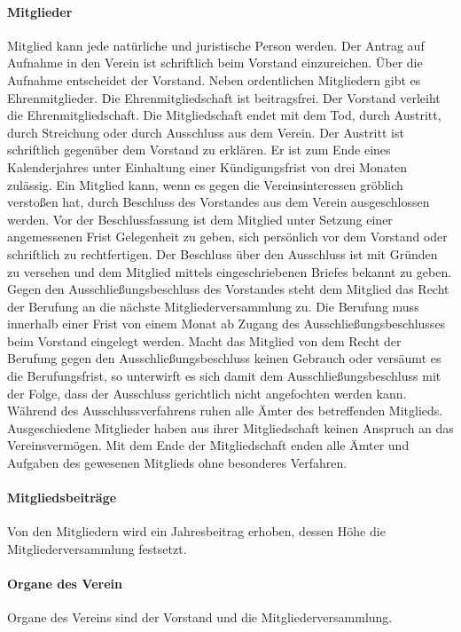 \begin{multicols}{2}
\paragraph{Mitglieder}
Mitglied kann jede natürliche und juristische Person werden. Der Antrag auf
Aufnahme in den Verein ist schriftlich beim Vorstand einzureichen. Über die
Aufnahme entscheidet der Vorstand. Neben ordentlichen Mitgliedern gibt es
Ehrenmitglieder. Die Ehrenmitgliedschaft ist beitragsfrei. Der Vorstand
verleiht die Ehrenmitgliedschaft. Die Mitgliedschaft endet mit dem Tod,
durch Austritt, durch Streichung oder durch Ausschluss aus dem Verein.
Der Austritt ist schriftlich gegenüber dem Vorstand zu erklären. Er ist zum
Ende eines Kalenderjahres unter Einhaltung einer Kündigungsfrist von drei
Monaten zulässig. Ein Mitglied kann, wenn es gegen die Vereinsinteressen
gröblich verstoßen hat, durch Beschluss des Vorstandes aus dem Verein
ausgeschlossen werden. Vor der Beschlussfassung ist dem Mitglied unter
Setzung einer angemessenen Frist Gelegenheit zu geben, sich persönlich
vor dem Vorstand oder schriftlich zu rechtfertigen. Der Beschluss über den
Ausschluss ist mit Gründen zu versehen und dem Mitglied mittels
eingeschriebenen Briefes bekannt zu geben. Gegen den
Ausschließungsbeschluss des Vorstandes steht dem Mitglied das Recht der
Berufung an die nächste Mitgliederversammlung zu. Die Berufung muss
innerhalb einer Frist von einem Monat ab Zugang des
Ausschließungsbeschlusses beim Vorstand eingelegt werden. Macht das
Mitglied von dem Recht der Berufung gegen den Ausschließungsbeschluss
keinen Gebrauch oder versäumt es die Berufungsfrist, so unterwirft es sich
damit dem Ausschließungsbeschluss mit der Folge, dass der Ausschluss
gerichtlich nicht angefochten werden kann. Während des
Ausschlussverfahrens ruhen alle Ämter des betreffenden Mitglieds.
Ausgeschiedene Mitglieder haben aus ihrer Mitgliedschaft keinen Anspruch
an das Vereinsvermögen. Mit dem Ende der Mitgliedschaft enden alle
Ämter und Aufgaben des gewesenen Mitglieds ohne besonderes Verfahren.
\paragraph{Mitgliedsbeiträge}
Von den Mitgliedern wird ein Jahresbeitrag erhoben, dessen Höhe die
Mitgliederversammlung festsetzt.
\paragraph{Organe des Verein}
Organe des Vereins sind der Vorstand und die Mitgliederversammlung.

\end{multicols}
